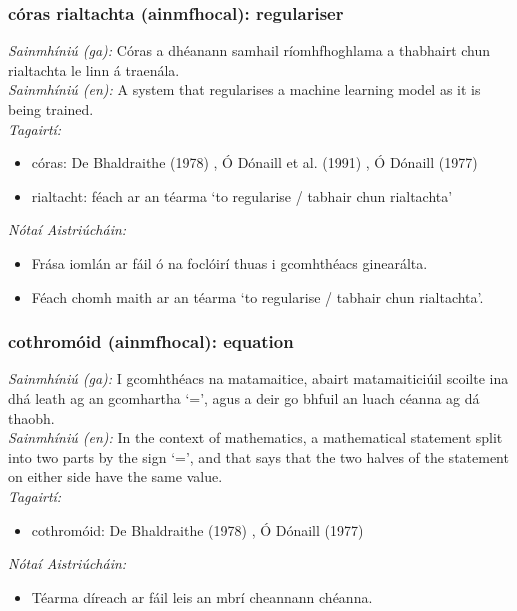 \documentclass{article}
\begin{document}
\subsubsection*{córas rialtachta (ainmfhocal): regulariser}
 \noindent \textit{Sainmhíniú (ga):} Córas a dhéanann samhail ríomhfhoghlama a thabhairt chun rialtachta le linn á traenála.
\\
 \noindent \textit{Sainmhíniú (en):} A system that regularises a machine learning model as it is being trained.
\\
 \noindent \textit{Tagairtí:}
\begin{itemize}
	\item córas: De Bhaldraithe (1978) \cite{de-bhaldraithe}, Ó Dónaill et al. (1991) \cite{focloir-beag}, Ó Dónaill (1977) \cite{odonaill}
	\item rialtacht: féach ar an téarma `to regularise / tabhair chun rialtachta'
\end{itemize}

 \noindent \textit{Nótaí Aistriúcháin:}
\begin{itemize}
	\item Frása iomlán ar fáil ó na foclóirí thuas i gcomhthéacs ginearálta.
	\item Féach chomh maith ar an téarma `to regularise / tabhair chun rialtachta'.
\end{itemize}


\subsubsection*{cothromóid (ainmfhocal): equation}
 \noindent \textit{Sainmhíniú (ga):} I gcomhthéacs na matamaitice, abairt matamaiticiúil scoilte ina dhá leath ag an gcomhartha `=', agus a deir go bhfuil an luach céanna ag dá thaobh.
\\
 \noindent \textit{Sainmhíniú (en):} In the context of mathematics, a mathematical statement split into two parts by the sign `=', and that says that the two halves of the statement on either side have the same value.
\\
 \noindent \textit{Tagairtí:}
\begin{itemize}
	\item cothromóid: De Bhaldraithe (1978) \cite{de-bhaldraithe}, Ó Dónaill (1977) \cite{odonaill}
\end{itemize}

 \noindent \textit{Nótaí Aistriúcháin:}
\begin{itemize}
	\item Téarma díreach ar fáil leis an mbrí cheannann chéanna.
\end{itemize}
\end{document}
